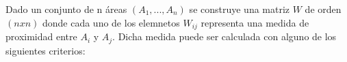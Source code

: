 Dado un conjunto de n áreas $(A_1, ..., A_n)$ se construye una matriz $W$ de orden $(n x n)$ donde cada uno de los elemnetos $W_{ij}$ representa una medida de proximidad entre $A_i$ y $A_j$. Dicha medida puede ser calculada con alguno de los siguientes criterios:
